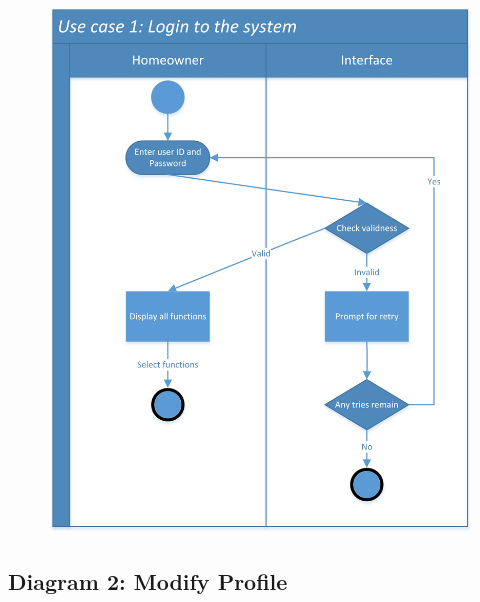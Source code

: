\documentclass[twoside,11pt]{article}
\begin{document}
\begin{figure}[H]
    \centering
    \includegraphics[width=1\columnwidth]{SwimLaneDiagram/Usecase_1.jpg}
\end{figure}
\newpage

\subsection{Diagram 2: Modify Profile}
\end{document}
